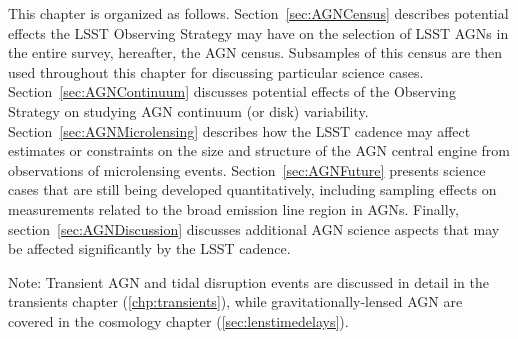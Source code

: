 This chapter is organized as follows. Section~\ref{sec:AGNCensus}
describes potential effects the LSST Observing Strategy may have on the
selection of LSST AGNs in the entire survey, hereafter, the AGN
census. Subsamples of this census are then used throughout this chapter for
discussing particular science cases. Section~\ref{sec:AGNContinuum}
discusses potential effects of the Observing Strategy on studying AGN continuum
(or disk) variability. Section~\ref{sec:AGNMicrolensing} describes how the
LSST cadence may affect estimates or constraints on the size and structure of
the AGN central engine from observations of microlensing events.
Section~\ref{sec:AGNFuture} presents science cases that are still being
developed quantitatively, including sampling effects on measurements related
to the broad emission line region in AGNs. Finally,
section~\ref{sec:AGNDiscussion} discusses additional AGN science aspects that
may be affected significantly by the LSST cadence.

Note: Transient AGN and tidal disruption events are discussed in
detail in the transients chapter
(\autoref{chp:transients}), while gravitationally-lensed AGN are
covered in the cosmology chapter (\autoref{sec:lenstimedelays}).



% 


% 


% 












